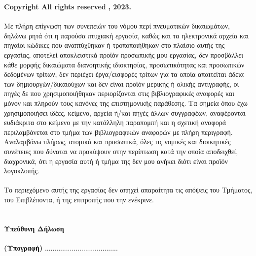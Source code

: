 \vspace{2.5cm}
{\bf \lt Copyright \textcopyright  All rights reserved} {\bf {}, 2023.}
\\
\vspace{0.5cm}
\\
{ Με πλήρη επίγνωση των συνεπειών του νόμου περί πνευματικών δικαιωμάτων, δηλώνω ρητά ότι η παρούσα πτυχιακή εργασία, καθώς και τα ηλεκτρονικά αρχεία και πηγαίοι κώδικες που αναπτύχθηκαν ή τροποποιήθηκαν στο πλαίσιο αυτής της εργασίας, αποτελεί αποκλειστικά προϊόν προσωπικής μου εργασίας, δεν προσβάλλει κάθε μορφής δικαιώματα διανοητικής ιδιοκτησίας, προσωπικότητας και προσωπικών δεδομένων τρίτων, δεν περιέχει έργα/εισφορές τρίτων για τα οποία απαιτείται άδεια των δημιουργών/δικαιούχων και δεν είναι προϊόν μερικής ή ολικής αντιγραφής, οι πηγές δε που χρησιμοποιήθηκαν περιορίζονται στις βιβλιογραφικές αναφορές και μόνον και πληρούν τους κανόνες της επιστημονικής παράθεσης. Τα σημεία όπου έχω χρησιμοποιήσει ιδέες, κείμενο, αρχεία ή/και πηγές άλλων συγγραφέων, αναφέρονται ευδιάκριτα στο κείμενο με την κατάλληλη παραπομπή και η σχετική αναφορά περιλαμβάνεται στο τμήμα των βιβλιογραφικών αναφορών με πλήρη περιγραφή. Αναλαμβάνω πλήρως, ατομικά και προσωπικά, όλες τις νομικές και διοικητικές συνέπειες που δύναται να προκύψουν στην περίπτωση κατά την οποία αποδειχθεί, διαχρονικά, ότι η εργασία αυτή ή τμήμα της δεν μου ανήκει διότι είναι προϊόν λογοκλοπής.}
\\
\vspace{0.5cm}
\\
{ Το περιεχόμενο αυτής της εργασίας δεν απηχεί απαραίτητα τις απόψεις του Τμήματος, του
Επιβλέποντα, ή της επιτροπής που την ενέκρινε.}
\\
\vspace{0.5cm}
\\
\\
{\bfseries Υπεύθυνη Δήλωση}
\\ \\
{\bfseries (Υπογραφή)}
......................................
\ \\\\
{ \bfseries {}}